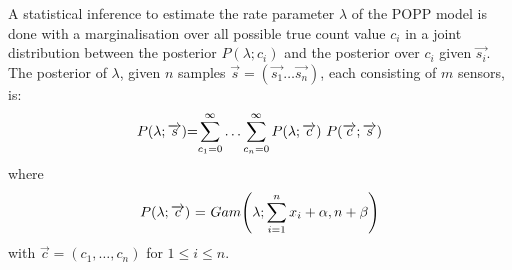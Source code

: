 A statistical inference to estimate the rate parameter $\lambda$ of the POPP model is done with a marginalisation over all possible true count value $c_i$ in a joint distribution between the posterior $P(\lambda ; c_i)$ and the posterior over $c_i$ given $\overrightarrow{s_i}$. The posterior of $\lambda$, given $n$ samples $\overrightarrow{s}=(\overrightarrow{s_1} \dots \overrightarrow{s_n})$, each consisting of $m$ sensors, is:
\begin{equation}
	\label{eq:marginal_occurrences}
	\begin{tabular}{r@{=}l}
		$P(\lambda ; \overrightarrow{s})$ &  $\displaystyle\sum_{c_1=0}^{\infty} \ldots \displaystyle\sum_{c_n=0}^{\infty} P(\lambda ; \overrightarrow{c}) ~ P(\overrightarrow{c} ; \overrightarrow{s})$ \\
	\end{tabular}
\end{equation}
\noindent where
\begin{equation*}
	\begin{tabular}{r@{ = }l}
		$P(\lambda ; \overrightarrow{c})$ & $Gam\Bigg(\lambda ; \displaystyle\sum_{i=1}^{n} x_i + \alpha, n + \beta \Bigg)$
	\end{tabular}
\end{equation*}
\noindent with $\overrightarrow{c} = (c_1, \ldots, c_n)$ for $1 \leq i \leq n$.

